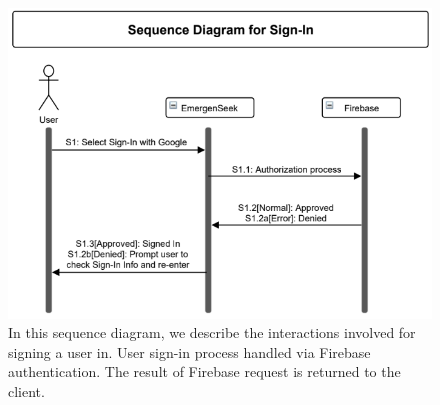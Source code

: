 \documentclass[10pt, a4paper]{article}
\begin{document}
\begin{figure}[H]
  \centerline{
  	\includegraphics[scale=0.8]{diagrams/sequence-3.png}
  }  
  \caption{In this sequence diagram, we describe the interactions involved for signing a user in. User sign-in process handled via Firebase authentication. The result of Firebase request is returned to the client.}
\end{figure}

%
%
\end{document}
